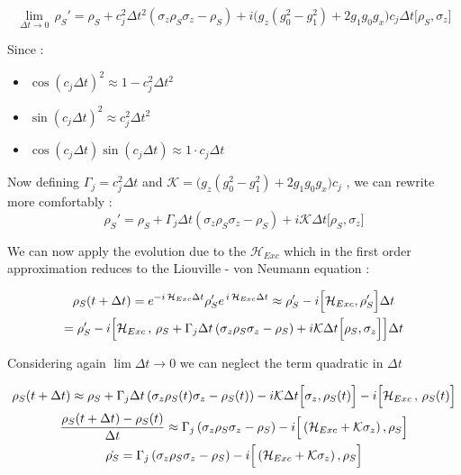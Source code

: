 \documentclass[a4paper,12pt]{article}
\begin{document}
	\begin{equation}
		\lim\limits_{\Delta t \rightarrow 0} \, \rho_S' = \rho_S + c_{j}^{2} \Delta t ^{2} \left( \sigma_{z} \rho_S \sigma_{z} - \rho_S \right) + i \Big( g_{z}\left(g_{0}^{2} - g_{1}^{2} \right) + 2 g_{1} g_{0} g_{x} \Big) c_j \Delta t [\rho_S , \sigma_{z} \Big]
		\label{eq:lim0_comp_rho_s}
	\end{equation}

	Since : \begin{itemize}
	\item $ \cos{\left(c_j \Delta t \right)}^{2} \approx 1 - c_{j}^{2} \Delta t ^{2} $
	\item $ \sin{\left(c_j \Delta t \right)}^{2} \approx c_{j}^{2} \Delta t ^{2} $
	\item $ \cos{\left(c_j \Delta t \right)} \sin{\left(c_j \Delta t \right)} \approx 1 \cdot c_j \Delta t  $
\end{itemize}
Now defining $ \Gamma_{j} = c_{j}^{2} \Delta t $ and $ \mathcal{K} = \Big( g_{z}\left(g_{0}^{2} - g_{1}^{2} \right) + 2 g_{1} g_{0} g_{x} \Big) c_j $ , we can rewrite more comfortably :
\begin{equation}
	\rho_S' = \rho_S + \Gamma_{j} \Delta t \left( \sigma_{z} \rho_S \sigma_{z} - \rho_S \right) + i \mathcal{K} \Delta t \Big[ \rho_S , \sigma_{z} \Big]
	\label{eq:compact_rho_S_evo}
\end{equation}

We can now apply the evolution due to the $ \mathcal{H}_{Exc} $ which in the first order approximation reduces to the Liouville - von Neumann equation :

\begin{gather}
	\rho_S (t + \Delta t) = e^{-i \, \mathcal{H}_{Exc} \Delta t} \rho_S' e^{\, i \, \mathcal{H}_{Exc} \Delta t} \approx \rho_S' - i \Big[\mathcal{H}_{Exc} , \rho_S' \Big] \Delta t \notag \\
	= \rho_S' - i \Big[ \mathcal{H}_{Exc} \, , \, \rho_S + \Gamma_{j} \Delta t \left( \sigma_{z} \rho_S \sigma_{z} - \rho_S \right) + i \mathcal{K} \Delta t \Big[ \rho_S , \sigma_{z} \Big] \Big] \Delta t
	\label{eq:compact_complete_rho_S_evo}
\end{gather}

Considering again $ \lim \Delta t \rightarrow 0 $ we can neglect the term quadratic in $ \Delta t $

\begin{gather}
	\rho_S (t + \Delta t) \approx \rho_S + \Gamma_{j} \Delta t \left( \sigma_{z} \rho_S (t) \sigma_{z} - \rho_S (t) \right) - i \mathcal{K} \Delta t \Big[ \sigma_{z} , \rho_S (t) \Big] - i \Big[ \mathcal{H}_{Exc} \, , \, \rho_S (t) \Big] \notag \\
	\frac{\rho_S (t + \Delta t) - \rho_S (t)}{\Delta t} \approx \Gamma_{j} \left( \sigma_{z} \rho_S \sigma_{z} - \rho_S \right) - i \Big[ \left( \mathcal{H}_{Exc} + \mathcal{K} \sigma_z \right), \rho_S \Big] \notag \\
	\dot{\rho_S} = \Gamma_{j} \left( \sigma_{z} \rho_S \sigma_{z} - \rho_S \right) - i \Big[ \left( \mathcal{H}_{Exc} + \mathcal{K} \sigma_z \right), \rho_S \Big]
	\label{eq:final_complete_form_rho_S_evo}
\end{gather}
\end{document}
